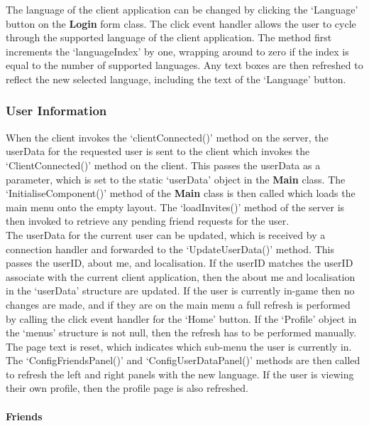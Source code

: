 \documentclass{article}
\begin{document}
The language of the client application can be changed by clicking the `Language' button on the \textbf{Login} form class. The click event handler allows the user to cycle through the supported language of the client application. The method first increments the `languageIndex' by one, wrapping around to zero if the index is equal to the number of supported languages. Any text boxes are then refreshed to reflect the new selected language, including the text of the `Language' button.

\subsubsection{User Information}

When the client invokes the `clientConnected()' method on the server, the userData for the requested user is sent to the client which invokes the `ClientConnected()' method on the client. This passes the userData as a parameter, which is set to the static `userData' object in the \textbf{Main} class. The `InitialiseComponent()' method of the \textbf{Main} class is then called which loads the main menu onto the empty layout. The `loadInvites()' method of the server is then invoked to retrieve any pending friend requests for the user. \\

The userData for the current user can be updated, which is received by a connection handler and forwarded to the `UpdateUserData()' method. This passes the userID, about me, and localisation. If the userID matches the userID associate with the current client application, then the about me and localisation in the `userData' structure are updated. If the user is currently in-game then no changes are made, and if they are on the main menu a full refresh is performed by calling the click event handler for the `Home' button. If the `Profile' object in the `menus' structure is not null, then the refresh has to be performed manually. The page text is reset, which indicates which sub-menu the user is currently in. The `ConfigFriendsPanel()' and `ConfigUserDataPanel()' methods are then called to refresh the left and right panels with the new language. If the user is viewing their own profile, then the profile page is also refreshed.

\paragraph{Friends\\}
\end{document}
